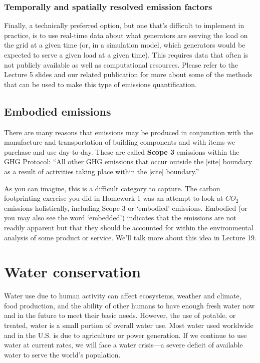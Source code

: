 \documentclass[10pt]{article}
\begin{document}
\subsubsection{Temporally and spatially resolved emission factors}

Finally, a technically preferred option, but one that's difficult to implement in practice, is to use real-time data about what generators are serving the load on the grid at a given time (or, in a simulation model, which generators would be expected to serve a given load at a given time). This requires data that often is not publicly available as well as computational resources. Please refer to the Lecture 5 slides and our related publication \cite{Fallahi2018SETA} for more about some of the methods that can be used to make this type of emissions quantification.

\subsection{Embodied emissions}

There are many reasons that emissions may be produced in conjunction with the manufacture and transportation of building components and with items we purchase and use day-to-day. These are called \textbf{Scope 3} emissions within the GHG Protocol: ``All other GHG emissions that occur outside
the [site] boundary as a result of activities
taking place within the [site] boundary.'' \cite{ghgprotocol2014}

As you can imagine, this is a difficult category to capture. The carbon footprinting exercise you did in Homework 1 was an attempt to look at $CO_2$ emissions holistically, including Scope 3 or `embodied' emissions. Embodied (or you may also see the word `embedded') indicates that the emissions are not readily apparent but that they should be accounted for within the environmental analysis of some product or service.  We'll talk more about this idea in Lecture 19.

\section{Water conservation}

Water use due to human activity can affect ecosystems, weather and climate, food production, and the ability of other humans to have enough fresh water now and in the future to meet their basic needs. However, the use of potable, or treated, water is a small portion of overall water use. Most water used worldwide \cite{noauthor_2015-ye} and in the U.S. \cite{EPAhowweusewater} is due to agriculture or power generation. If we continue to use water at current rates, we will face a water crisis---a severe deficit of available water to serve the world's population.
\end{document}
